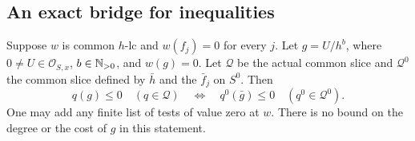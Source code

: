 \subsection{An exact bridge for inequalities}

\begin{proposition}\label{prop:F-bridge}
Suppose $w$ is common $h$-lc and $w(f_j)=0$ for every $j$.
Let $g=U/h^b$, where $0\ne U\in\mathcal O_{S,x}$,
$b\in\mathbb N_{>0}$, and $w(g)=0$.  Let $\mathcal Q$ be the actual
common slice and $\mathcal Q^0$ the common slice defined by
$\bar h$ and the $\bar f_j$ on $S^0$.  Then
\begin{equation}\label{eq:F-bridge}
 q(g)\le0\quad(q\in\mathcal Q)
 \quad\Longleftrightarrow\quad
 q^0(\bar g)\le0\quad(q^0\in\mathcal Q^0).
\end{equation}
One may add any finite list of tests of value zero at $w$.
There is no bound on the degree or the cost of $g$ in this statement.
\end{proposition}

